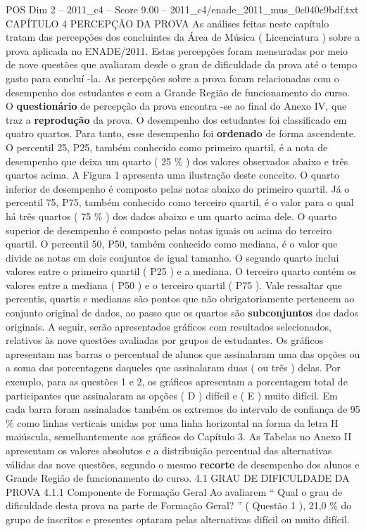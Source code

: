 \begin{textsample}{POS Dim 2 – 2011\_c4 – Score 9.00 – 2011\_c4/enade\_2011\_mus\_0c040c9bdf.txt}  \label{ex:f2_pos_124}
CAPÍTULO 4 PERCEPÇÃO DA PROVA As análises feitas neste capítulo tratam das percepções dos concluintes da Área de Música ( Licenciatura ) sobre a prova aplicada no ENADE/2011.
Estas percepções foram mensuradas por meio de nove questões que avaliaram desde o grau de dificuldade da prova até o tempo gasto para concluí -la.
As percepções sobre a prova foram relacionadas com o desempenho dos estudantes e com a Grande Região de funcionamento do curso.
O \textbf{questionário} de percepção da prova encontra -se ao final do Anexo IV, que traz a \textbf{reprodução} da prova.
O desempenho dos estudantes foi classificado em quatro quartos.
Para tanto, esse desempenho foi \textbf{ordenado} de forma ascendente.
O percentil 25, P25, também conhecido como primeiro quartil, é a nota de desempenho que deixa um quarto ( 25 \% ) dos valores observados abaixo e três quartos acima.
A Figura 1 apresenta uma ilustração deste conceito.
O quarto inferior de desempenho é composto pelas notas abaixo do primeiro quartil.
Já o percentil 75, P75, também conhecido como terceiro quartil, é o valor para o qual há três quartos ( 75 \% ) dos dados abaixo e um quarto acima dele.
O quarto superior de desempenho é composto pelas notas iguais ou acima do terceiro quartil.
O percentil 50, P50, também conhecido como mediana, é o valor que divide as notas em dois conjuntos de igual tamanho.
O segundo quarto inclui valores entre o primeiro quartil ( P25 ) e a mediana.
O terceiro quarto contém os valores entre a mediana ( P50 ) e o terceiro quartil ( P75 ).
Vale ressaltar que percentis, quartis e medianas são pontos que não obrigatoriamente pertencem ao conjunto original de dados, ao passo que os quartos são \textbf{subconjuntos} dos dados originais.
A seguir, serão apresentados gráficos com resultados selecionados, relativos às nove questões avaliadas por grupos de estudantes.
Os gráficos apresentam nas barras o percentual de alunos que assinalaram uma das opções ou a soma das porcentagens daqueles que assinalaram duas ( ou três ) delas.
Por exemplo, para as questões 1 e 2, os gráficos apresentam a porcentagem total de participantes que assinalaram as opções ( D ) difícil e ( E ) muito difícil.
Em cada barra foram assinalados também os extremos do intervalo de confiança de 95 \% como linhas verticais unidas por uma linha horizontal na forma da letra H maiúscula, semelhantemente aos gráficos do Capítulo 3.
As Tabelas no Anexo II apresentam os valores absolutos e a distribuição percentual das alternativas válidas das nove questões, segundo o mesmo \textbf{recorte} de desempenho dos alunos e Grande Região de funcionamento do curso. 4.1 GRAU DE DIFICULDADE DA PROVA 4.1.1 Componente de Formação Geral Ao avaliarem “ Qual o grau de dificuldade desta prova na parte de Formação Geral? ” ( Questão 1 ), 21,0 \% do grupo de inscritos e presentes optaram pelas alternativas difícil ou muito difícil.

\end{textsample}
